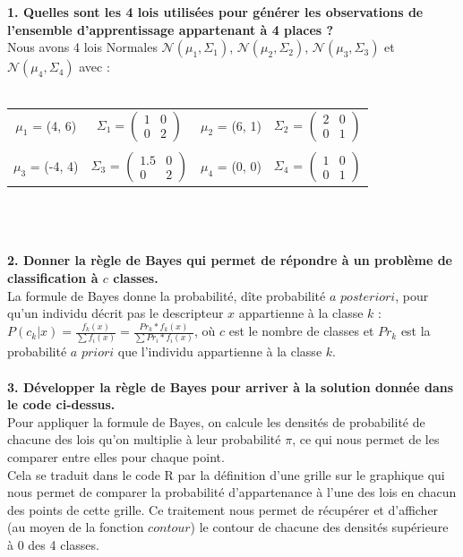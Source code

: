 \documentclass[a4paper, 10pt]{article}
\begin{document}
\textbf{1. Quelles sont les 4 lois utilisées pour générer les observations de l’ensemble d’apprentissage appartenant à 4 places ?}\\
Nous avons 4 lois Normales $\mathcal{N}(\mu_{1}, \Sigma_{1})$, $\mathcal{N}(\mu_{2}, \Sigma_{2})$, $\mathcal{N}(\mu_{3}, \Sigma_{3})$ et $\mathcal{N}(\mu_{4}, \Sigma_{4})$ avec :\\ \\
\hspace*{0.5cm}
\begin{tabular}{cccc}
$\mu_{1}$ = (4, 6) &
$\Sigma_{1} = \begin{pmatrix} 1 & 0 \\ 0 & 2 \end{pmatrix}$ &
$\mu_{2}$ = (6, 1) &
$\Sigma_{2}$ = $\begin{pmatrix} 2 & 0 \\ 0 & 1 \end{pmatrix}$\\ \\
$\mu_{3}$ = (-4, 4) &
$\Sigma_{3}$ = $\begin{pmatrix} 1.5 & 0 \\ 0 & 2 \end{pmatrix}$ &
$\mu_{4}$ = (0, 0) &
$\Sigma_{4}$ = $\begin{pmatrix} 1 & 0 \\ 0 & 1 \end{pmatrix}$\\
\end{tabular}\\ \\ \\
\textbf{2. Donner la règle de Bayes qui permet de répondre à un problème de classification à $c$ classes.}\\
La formule de Bayes donne la probabilité, dîte probabilité $a$ $posteriori$, pour qu'un individu décrit pas le descripteur $x$ appartienne à la classe $k$ :
$P(c_{k}|x) = \frac{f_{k}(x)}{\sum{f_{i}(x)}} = \frac{Pr_{k} * f_{k}(x)}{\sum{}Pr_{i} * f_{i}(x)}$, où $c$ est le nombre de classes et $Pr_{k}$ est la probabilité $a$ $priori$ que l'individu appartienne à la classe $k$.\\ \\
\textbf{3. Développer la règle de Bayes pour arriver à la solution donnée dans le code ci-dessus.}\\
Pour appliquer la formule de Bayes, on calcule les densités de probabilité de chacune des lois qu'on multiplie à leur probabilité $\pi$, ce qui nous permet de les comparer entre elles pour chaque point.\\
Cela se traduit dans le code R par la définition d'une grille sur le graphique qui nous permet de comparer la probabilité d'appartenance à l'une des lois en chacun des points de cette grille. Ce traitement nous permet de récupérer et d'afficher (au moyen de la fonction $contour$) le contour de chacune des densités supérieure à 0 des 4 classes.
\end{document}
